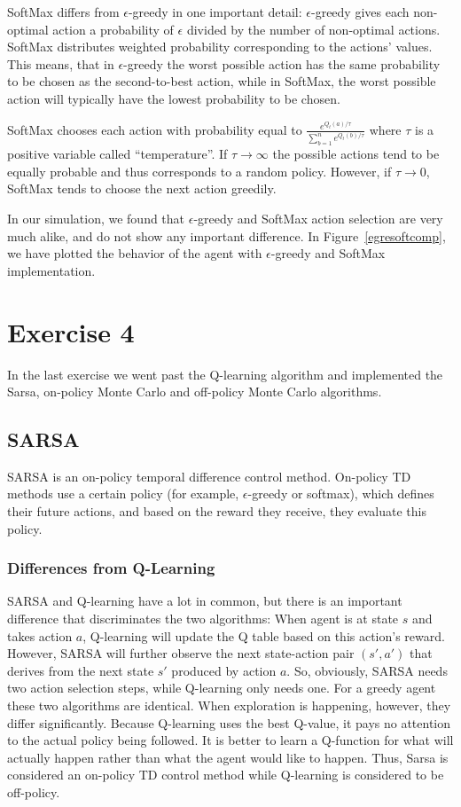 \documentclass[a4paper,11pt]{article}
\begin{document}
SoftMax differs from $\epsilon$-greedy in one important detail: $\epsilon$-greedy gives each non-optimal action a probability of $\epsilon$ divided by the number of non-optimal actions.  SoftMax distributes weighted probability corresponding to the actions' values. This means, that in $\epsilon$-greedy the worst possible action has the same probability to be chosen as the second-to-best action, while in SoftMax, the worst possible action will typically have the lowest probability to be chosen.

SoftMax chooses each action with probability equal to $\frac{e^{Q_t(a)/ \tau}}{\sum^n_{b=1} e^{Q_t(b)/ \tau}}$
where $\tau$ is a positive variable called ``temperature''. If $\tau \rightarrow \infty$ the possible actions tend to be equally probable and thus corresponds to a random policy. However, if $\tau \rightarrow 0$, SoftMax tends to choose the next action greedily.

In our simulation, we found that $\epsilon$-greedy and SoftMax action selection are very much alike, and do not show any important difference. In Figure~\ref{egresoftcomp}, we have plotted the behavior of the agent with $\epsilon$-greedy and SoftMax implementation.


\section*{Exercise 4}
In the last exercise we went past the Q-learning algorithm and implemented the Sarsa, on-policy Monte Carlo and off-policy Monte Carlo algorithms. 	

\subsection*{SARSA}
SARSA is an on-policy temporal difference control method. On-policy TD methods use a certain policy (for example, $\epsilon$-greedy or softmax), which defines their future actions, and based on the reward they receive, they evaluate this policy.

\subsubsection*{Differences from Q-Learning}
SARSA and Q-learning have a lot in common, but there is an important difference that discriminates the two algorithms: When agent is at state $s$ and takes action $a$, Q-learning will update the Q table based on this action's reward. However, SARSA will further observe the next state-action pair $(s',a')$ that derives from the next state $s'$ produced by action $a$. So, obviously, SARSA needs two action selection steps, while Q-learning only needs one. For a greedy agent these two algorithms are identical. When exploration is happening, however, they differ significantly. Because Q-learning uses the best Q-value, it pays no attention to the actual policy being followed. It is better to learn a Q-function for what will actually happen rather than what the agent would like to happen. Thus, Sarsa is considered an on-policy TD control method while Q-learning is considered to be off-policy.
\end{document}
